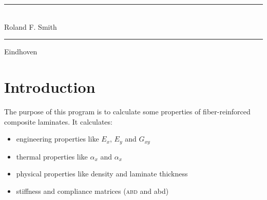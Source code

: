 \documentclass[a4paper,landscape,oneside,11pt,twocolumn]{memoir}
\title{\TheTitle}
\author{Roland F. Smith}
\date{\TheDate}
\begin{document}
\tightlists
\hangcaption
\captiontitlefont{\small}
\doccoltocetc

\nonzeroparskip
\setlength{\parindent}{0pt}
\setbeforesecskip{5pt}
\setaftersecskip{1pt}
\setbeforesubsecskip{5pt}
\setaftersubsecskip{1pt}



\begin{titlingpage}
  \setlength{\parindent}{0pt} %
  \rule{\linewidth}{1mm}\vspace{5pt}
  \begin{flushright}
      {\Huge \TheTitle}\\[5mm]
      {\huge Roland F. Smith}
  \end{flushright}
  \rule{\linewidth}{1mm}
  \begin{center}
    \Large Eindhoven \number\year
  \end{center}
\end{titlingpage}

\setcounter{page}{2}
\pagestyle{logboek}

\begin{KeepFromToc}
\tableofcontents
\end{KeepFromToc}
\clearpage

\setcounter{secnumdepth}{1}

\chapter{Introduction} %

The purpose of this program is to calculate some properties of
fiber-reinforced composite laminates. It calculates:
\begin{itemize}
    \item engineering properties like $E_x$, $E_y$ and $G_{xy}$
    \item thermal properties like $\alpha_x$ and $\alpha_x$
    \item physical properties like density and laminate thickness
    \item stiffness and compliance matrices (\textsc{abd} and abd)
\end{itemize}
\end{document}
